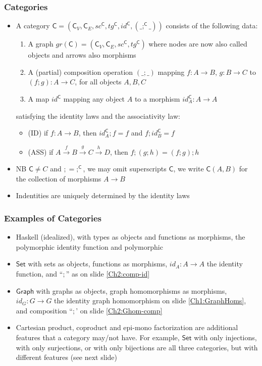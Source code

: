 \documentclass[handout]{beamer}
\newcommand{\Set}{\mathsf{Set}}
\newcommand{\Gra}{\mathsf{Graph}}
\newcommand{\CC}{\mathsf{C}}
\begin{document}
\frame
  {   
    \frametitle{Categories}\label{Ch2:categories}

 \begin{itemize}[<+->]
\item A category $\CC = (\CC_V,\CC_E,sc^\CC, tg^\CC, id^\CC,(\_;^\CC\_))$ consists of the following data:
   \begin{enumerate}[<+->]
\item A graph $gr(\CC) =  (\CC_V,\CC_E,sc^\CC, tg^\CC)$ where nodes are now also called objects
and arrows also morphisms
\item A (partial) composition operation $(\_;\_)$ mapping $f: A\to B$, $g: B\to C$
to $(f;g): A\to C$, for all objects $A,B,C$
\item A map $id^\CC$ mapping any object $A$ to a morphism $id^\CC_A: A\to A$
   \end{enumerate}
satisfying the identity laws and the associativity law:
   \begin{itemize}[<+->]
\item(ID) if $f: A\to B$, then $id^\CC_A;f = f$ and  $f;id^\CC_B = f$
\item(ASS) if $A \stackrel{f}{\to} B \stackrel{g}{\to} C \stackrel{h}{\to}D $, then $f;(g;h)=(f;g);h$
   \end{itemize}
\item NB $\CC \neq C$ and ${;} = {;^\CC}$, we may omit superscripts $\CC$,
we write $\CC(A,B)$ for the collection of morphisms $A\to B$
\item Indentities are uniquely determined by the identity laws
 \end{itemize}

 }

\frame
  {   
    \frametitle{Examples of Categories}\label{Ch2:ExaCat}

 \begin{itemize}[<+->]
\item Haskell (idealized), with types as objects and functions as morphisms, 
the polymorphic identity function and polymorphic 
\item $\Set$ with sets as objects, functions as morphisms,
$id_A: A\to A$ the identity function, and ``$;$'' as on slide \ref{Ch2:comp-id}
\item $\Gra$ with graphs as objects, graph homomorphisms as morphisms,
$id_G: G\to G$ the identity graph homomorphism on slide \ref{Ch1:GraphHoms}, 
and composition ``$;$' on slide \ref{Ch2:Ghom-comp}
\item Cartesian product, coproduct and epi-mono factorization are additional
features that a category may/not have. For example, $\Set$ with only injections,
with only surjections, or with only bijections are all three categories, but
with different features (see next slide)
 \end{itemize}

 }
\end{document}
